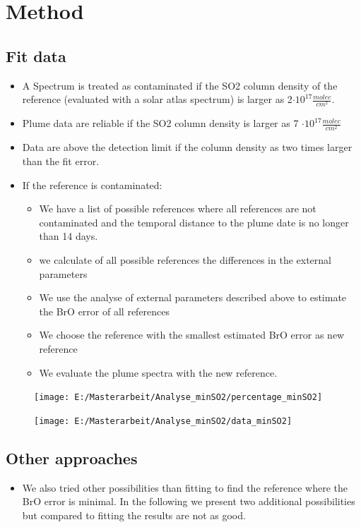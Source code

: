 \documentclass  [
  paper    = a4,
  BCOR     = 10mm,
  twoside,
  fontsize = 12pt,
  fleqn,
  toc      = bibnumbered,
  toc      = listofnumbered,
  numbers  = noendperiod,
  headings = normal,
  listof   = leveldown,
  version  = 3.03
]                                       {scrreprt}
\begin{document}
	\chapter{Method}
	\section{Fit data}
	\begin{itemize}
		\item A Spectrum is treated as contaminated if the SO2 column density of the reference (evaluated with a solar atlas spectrum) is larger as 2$\cdot 10^{17}\frac{molec}{cm^2}$.
		\item Plume data are reliable if the SO2 column density is larger as 7 $\cdot 10^{17} \frac{molec}{cm^2}$
		\item Data are above the detection limit if the column density as two times larger than the fit error.
		\item If the reference is contaminated:
		\begin{itemize}
			\item We have a list of possible references where all references are not contaminated and the temporal distance to the plume date is no longer than 14 days.
			\item we calculate of all possible references the differences in the external parameters
			\item We use the analyse of external parameters described above to estimate the BrO error of all references
			\item We choose the reference with the smallest estimated BrO error as new reference
			\item We evaluate the plume spectra with the new reference.
		\end{itemize}
	\end{itemize}
\begin{figure}
	\centering
	\texttt{[image: E:/Masterarbeit/Analyse\_minSO2/percentage\_minSO2]}
	\caption{}
	\label{fig:percentageminso2}
\end{figure}
\begin{figure}
	\centering
	\texttt{[image: E:/Masterarbeit/Analyse\_minSO2/data\_minSO2]}
	\caption{}
	\label{fig:dataminso2}
\end{figure}

	\section{Other approaches}
	\begin{itemize}
		\item We also tried other possibilities than fitting to find the reference where the BrO error is minimal. In the following we present two additional possibilities but compared to fitting the results are not as good.
	\end{itemize}
\end{document}
